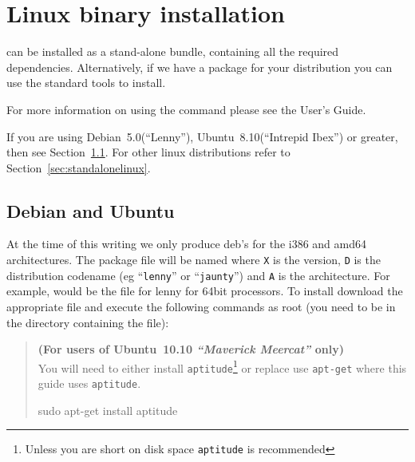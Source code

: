 %
%
%

\section{Linux binary installation}
\label{sec:binlinux}

\esfinley can be installed as a stand-alone bundle, containing all the required dependencies.
Alternatively, if we have a package for your distribution you can use the standard tools to install.


For more information on using the  command please see the User's Guide.

If you are using Debian~5.0(``Lenny''), Ubuntu~8.10(``Intrepid Ibex'') or greater, then see Section~\ref{sec:debian}.
For other linux distributions refer to Section~\ref{sec:standalonelinux}.

\subsection{Debian and Ubuntu}\label{sec:debian}

At the time of this writing we only produce deb's for the i386 and amd64 architectures.
The package file will be named  where \texttt{X} is the version, \texttt{D} is the distribution codename (eg ``\texttt{lenny}'' or ``\texttt{jaunty}'') and \texttt{A} is the architecture.
For example,  would be the file for lenny for 64bit processors.
To install \esfinley download the appropriate  file and execute the following commands as root (you need to be in the directory containing the file):

\begin{verse}
\textbf{(For users of Ubuntu~10.10 \textit{``Maverick Meercat''} only)}\\
You will need to either install \texttt{aptitude}\footnote{Unless you are short on disk space \texttt{aptitude} is recommended} or replace use \texttt{apt-get} where this guide uses \texttt{aptitude}.
\begin{shellCode}
sudo apt-get install aptitude
\end{shellCode}
\end{verse}

